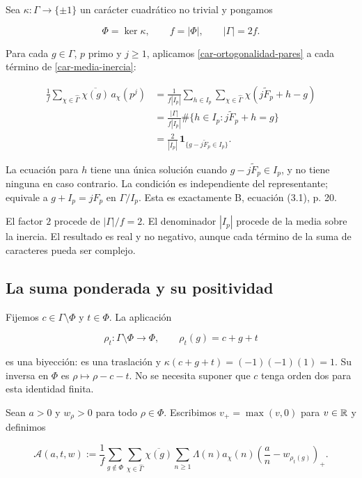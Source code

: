 Sea $\kappa:\Gamma\to\{\pm1\}$ un carácter cuadrático no trivial y pongamos

\[
\Phi=\ker\kappa,\qquad f=|\Phi|,
\qquad |\Gamma|=2f.
\]

Para cada $g\in\Gamma$, $p$ primo y $j\ge1$, aplicamos \eqref{car-ortogonalidad-pares} a cada término de \eqref{car-media-inercia}:

\begin{equation}
\begin{aligned}
\frac1f\sum_{\chi\in\widehat\Gamma}
\overline{\chi(g)}\,a_\chi(p^j)
&=\frac1{f|I_p|}\sum_{h\in I_p}
\sum_{\chi\in\widehat\Gamma}
\chi(j\widetilde F_p+h-g)\\
&=\frac{|\Gamma|}{f|I_p|}
\#\{h\in I_p:j\widetilde F_p+h=g\}\\
&=\frac2{|I_p|}\,
\mathbf1_{\{g-j\widetilde F_p\in I_p\}}.
\end{aligned}
\label{car-frobenius}
\end{equation}

La ecuación para $h$ tiene una única solución cuando $g-j\widetilde F_p\in I_p$, y no tiene ninguna en caso contrario. La condición es independiente del representante; equivale a $g+I_p=jF_p$ en $\Gamma/I_p$. Esta es exactamente B, ecuación (3.1), p. 20.

El factor $2$ procede de $|\Gamma|/f=2$. El denominador $|I_p|$ procede de la media sobre la inercia. El resultado es real y no negativo, aunque cada término de la suma de caracteres pueda ser complejo.

\subsection{La suma ponderada y su positividad}

Fijemos $c\in\Gamma\setminus\Phi$ y $t\in\Phi$. La aplicación

\[
\rho_t:\Gamma\setminus\Phi\longrightarrow\Phi,
\qquad \rho_t(g)=c+g+t
\]

es una biyección: es una traslación y $\kappa(c+g+t)=(-1)(-1)(1)=1$. Su inversa en $\Phi$ es $\rho\mapsto\rho-c-t$. No se necesita suponer que $c$ tenga orden dos para esta identidad finita.

Sean $a>0$ y $w_\rho>0$ para todo $\rho\in\Phi$. Escribimos $v_+=\max(v,0)$ para $v\in\mathbb{R}$ y definimos

\begin{equation}
\mathcal A(a,t,w)
:=\frac1f\sum_{g\notin\Phi}
\sum_{\chi\in\widehat\Gamma}\overline{\chi(g)}
\sum_{n\ge1}\Lambda(n)a_\chi(n)
\left(\frac an-w_{\rho_t(g)}\right)_+.
\label{car-suma-ponderada}
\end{equation}

